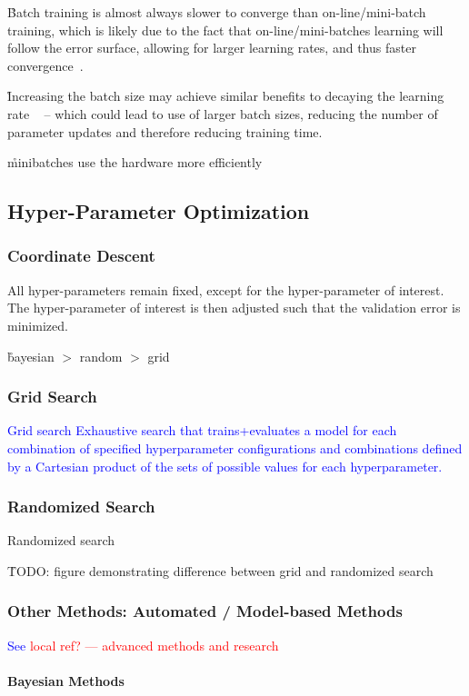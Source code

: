 \r{Batch training is almost always slower to converge than on-line/mini-batch training, which is likely due to the fact that on-line/mini-batches learning will follow the error surface, allowing for larger learning rates, and thus faster convergence~\cite{wilson2003general}.}

\r{Increasing the batch size may achieve similar benefits to decaying the learning rate ~\cite{smith2017don} -- which could lead to use of larger batch sizes, reducing the number of parameter updates and therefore reducing training time.}

\r{minibatches use the hardware more efficiently}


\subsection{Hyper-Parameter Optimization}




\subsubsection{Coordinate Descent}

All hyper-parameters remain fixed, except for the hyper-parameter of interest. The hyper-parameter of interest is then adjusted such that the validation error is minimized.

\r{bayesian $>$ random $>$ grid}

\subsubsection{Grid Search}

\textcolor{blue}{{Grid search} Exhaustive search that trains+evaluates a model for each combination of specified hyperparameter configurations and combinations defined by a Cartesian product of the sets of possible values for each hyperparameter.}

\subsubsection{Randomized Search}

\r{{Randomized search} }

\r{TODO: figure demonstrating difference between grid and randomized search}


\subsubsection{Other Methods: Automated / Model-based Methods}

\textcolor{blue}{See \textcolor{red}{local ref? --- advanced methods and research}}

\paragraph{Bayesian Methods}



